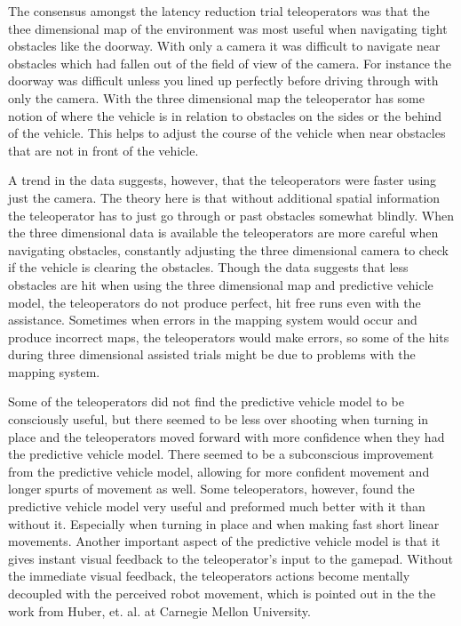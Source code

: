 \documentclass[12pt]{report}
\begin{document}
The consensus amongst the latency reduction trial teleoperators was that the thee dimensional map of the environment was most useful when navigating tight obstacles like the doorway.  With only a camera it was difficult to navigate near obstacles which had fallen out of the field of view of the camera.  For instance the doorway was difficult unless you lined up perfectly before driving through with only the camera.  With the three dimensional map the teleoperator has some notion of where the vehicle is in relation to obstacles on the sides or the behind of the vehicle.  This helps to adjust the course of the vehicle when near obstacles that are not in front of the vehicle.

A trend in the data suggests, however, that the teleoperators were faster using just the camera.  The theory here is that without additional spatial information the teleoperator has to just go through or past obstacles somewhat blindly.  When the three dimensional data is available the teleoperators are more careful when navigating obstacles, constantly adjusting the three dimensional camera to check if the vehicle is clearing the obstacles.  Though the data suggests that less obstacles are hit when using the three dimensional map and predictive vehicle model, the teleoperators do not produce perfect, hit free runs even with the assistance.  Sometimes when errors in the mapping system would occur and produce incorrect maps, the teleoperators would make errors, so some of the hits during three dimensional assisted trials might be due to problems with the mapping system.

Some of the teleoperators did not find the predictive vehicle model to be consciously useful, but there seemed to be less over shooting when turning in place and the teleoperators moved forward with more confidence when they had the predictive vehicle model.  There seemed to be a subconscious improvement from the predictive vehicle model, allowing for more confident movement and longer spurts of movement as well.  Some teleoperators, however, found the predictive vehicle model very useful and preformed much better with it than without it.  Especially when turning in place and when making fast short linear movements.  Another important aspect of the predictive vehicle model is that it gives instant visual feedback to the teleoperator's input to the gamepad.  Without the immediate visual feedback, the teleoperators actions become mentally decoupled with the perceived robot movement, which is pointed out in the the work from Huber, et. al. at Carnegie Mellon University\cite{photo_real}.
\end{document}
